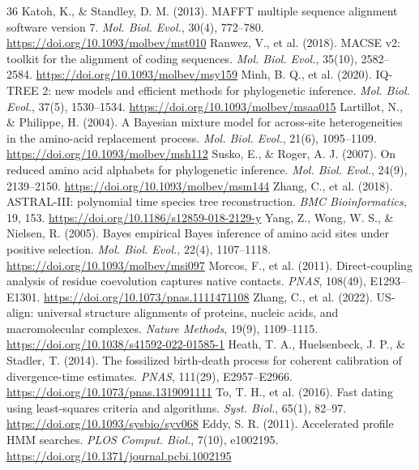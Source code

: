 \documentclass[10pt,letterpaper]{article}
\begin{document}
\begin{thebibliography}{36}
 Katoh, K., \& Standley, D. M. (2013). MAFFT multiple sequence alignment software version 7. \textit{Mol. Biol. Evol.}, 30(4), 772--780. \url{https://doi.org/10.1093/molbev/mst010}
 Ranwez, V., et al. (2018). MACSE v2: toolkit for the alignment of coding sequences. \textit{Mol. Biol. Evol.}, 35(10), 2582--2584. \url{https://doi.org/10.1093/molbev/msy159}
 Minh, B. Q., et al. (2020). IQ-TREE 2: new models and efficient methods for phylogenetic inference. \textit{Mol. Biol. Evol.}, 37(5), 1530--1534. \url{https://doi.org/10.1093/molbev/msaa015}
 Lartillot, N., \& Philippe, H. (2004). A Bayesian mixture model for across-site heterogeneities in the amino-acid replacement process. \textit{Mol. Biol. Evol.}, 21(6), 1095--1109. \url{https://doi.org/10.1093/molbev/msh112}
 Susko, E., \& Roger, A. J. (2007). On reduced amino acid alphabets for phylogenetic inference. \textit{Mol. Biol. Evol.}, 24(9), 2139--2150. \url{https://doi.org/10.1093/molbev/msm144}
 Zhang, C., et al. (2018). ASTRAL-III: polynomial time species tree reconstruction. \textit{BMC Bioinformatics}, 19, 153. \url{https://doi.org/10.1186/s12859-018-2129-y}
 Yang, Z., Wong, W. S., \& Nielsen, R. (2005). Bayes empirical Bayes inference of amino acid sites under positive selection. \textit{Mol. Biol. Evol.}, 22(4), 1107--1118. \url{https://doi.org/10.1093/molbev/msi097}
 Morcos, F., et al. (2011). Direct-coupling analysis of residue coevolution captures native contacts. \textit{PNAS}, 108(49), E1293--E1301. \url{https://doi.org/10.1073/pnas.1111471108}
 Zhang, C., et al. (2022). US-align: universal structure alignments of proteins, nucleic acids, and macromolecular complexes. \textit{Nature Methods}, 19(9), 1109--1115. \url{https://doi.org/10.1038/s41592-022-01585-1}
 Heath, T. A., Huelsenbeck, J. P., \& Stadler, T. (2014). The fossilized birth-death process for coherent calibration of divergence-time estimates. \textit{PNAS}, 111(29), E2957--E2966. \url{https://doi.org/10.1073/pnas.1319091111}
 To, T. H., et al. (2016). Fast dating using least-squares criteria and algorithms. \textit{Syst. Biol.}, 65(1), 82--97. \url{https://doi.org/10.1093/sysbio/syv068}
 Eddy, S. R. (2011). Accelerated profile HMM searches. \textit{PLOS Comput. Biol.}, 7(10), e1002195. \url{https://doi.org/10.1371/journal.pcbi.1002195}
\end{thebibliography}
\end{document}
